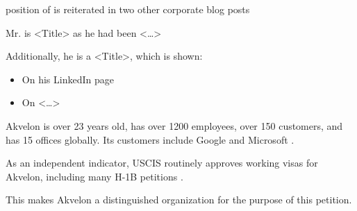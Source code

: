\mrls position of  is reiterated in two other corporate blog posts



Mr. \MrAkvelon is <Title> as he had been <\dots>

Additionally, he is a <Title>, which is shown:

\begin{itemize}

    \item On his LinkedIn page 

    \item On <\dots> 

\end{itemize}



Akvelon is over 23 years old, has over 1200 employees, over 150 customers, and has 15 offices globally.
Its customers include Google and Microsoft .

As an independent indicator, USCIS routinely approves working visas for Akvelon,
including many H-1B petitions .

This makes Akvelon a distinguished organization for the purpose of this petition.

